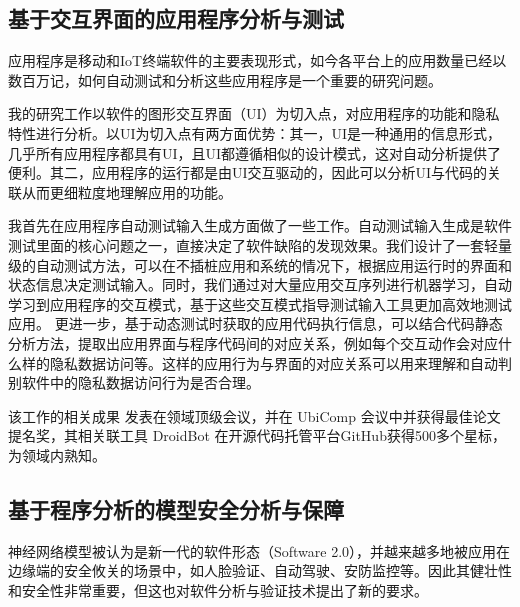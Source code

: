 \documentclass[12pt]{article}
\begin{document}
\subsection{基于交互界面的应用程序分析与测试}

应用程序是移动和IoT终端软件的主要表现形式，如今各平台上的应用数量已经以数百万记，如何自动测试和分析这些应用程序是一个重要的研究问题。

我的研究工作以软件的图形交互界面（UI）为切入点，对应用程序的功能和隐私特性进行分析。以UI为切入点有两方面优势：其一，UI是一种通用的信息形式，几乎所有应用程序都具有UI，且UI都遵循相似的设计模式，这对自动分析提供了便利。其二，应用程序的运行都是由UI交互驱动的，因此可以分析UI与代码的关联从而更细粒度地理解应用的功能。

我首先在应用程序自动测试输入生成方面做了一些工作。自动测试输入生成是软件测试里面的核心问题之一，直接决定了软件缺陷的发现效果。我们设计了一套轻量级的自动测试方法，可以在不插桩应用和系统的情况下，根据应用运行时的界面和状态信息决定测试输入。同时，我们通过对大量应用交互序列进行机器学习，自动学习到应用程序的交互模式，基于这些交互模式指导测试输入工具更加高效地测试应用。
更进一步，基于动态测试时获取的应用代码执行信息，可以结合代码静态分析方法，提取出应用界面与程序代码间的对应关系，例如每个交互动作会对应什么样的隐私数据访问等。这样的应用行为与界面的对应关系可以用来理解和自动判别软件中的隐私数据访问行为是否合理。

该工作的相关成果\cite{li2016peruim,li2017droidbot,liu2020pmc,li2019humanoid} 发表在领域顶级会议，并在 UbiComp 会议中并获得最佳论文提名奖，其相关联工具 DroidBot 在开源代码托管平台GitHub获得500多个星标\cite{droidbot:code}，为领域内熟知。
 

\subsection{基于程序分析的模型安全分析与保障}

神经网络模型被认为是新一代的软件形态（Software 2.0），并越来越多地被应用在边缘端的安全攸关的场景中，如人脸验证、自动驾驶、安防监控等。因此其健壮性和安全性非常重要，但这也对软件分析与验证技术提出了新的要求。
\end{document}
